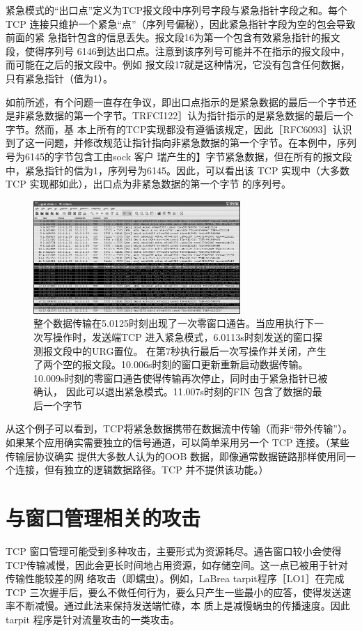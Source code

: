 紧急模式的“出口点”定义为TCP报文段中序列号字段与紧急指针字段之和。每个TCP 连接只维护一个紧急“点”（序列号偏秘），因此紧急指针字段为空的包会导致前面的紧
急指针包含的信息丢失。报文段16为第一个包含有效紧急指针的报文段，使得序列号 6146到达出口点。注意到该序列号可能并不在指示的报文段中，而可能在之后的报文段中。例如
报文段17就是这种情况，它没有包含任何数据，只有紧急指针（值为1）。

如前所述，有个问题一直存在争议，即出口点指示的是紧急数据的最后一个字节还是非紧急数据的第一个字节。TRFCI122］认为指针指示的是紧急数据的最后一个字节。然而，基
本上所有的TCP实现都没有遵循该规定，因此［RFC6093］认识到了这一问题，并修改规范让指针指向非紧急数据的第一个字节。在本例中，序列号为6145的字节包含工由sock 客户
瑞产生的】字节紧急数据，但在所有的报文段中，紧急指针的信为1，序列号为6145。因此，可以看出该 TCP 实现中（大多数 TCP 实现都如此），出口点为非紧急数据的第一个字节
的序列号。
\begin{figure}[!htb]
    \centering
	\includegraphics[width=0.7\textwidth]{imgs/15/15-18.png}
	\caption{整个数据传输在5.0125时刻出现了一次零窗口通告。当应用执行下一次写操作时，发送端TCP 进入紧急模式，6.0113s时刻发送的窗口探测报文段中的URG置位。
    在第7秒执行最后一次写操作并关闭，产生了两个空的报文段。10.006s时刻的窗口更新重新启动数据传输。10.009s时刻的零窗口通告使得传输再次停止，同时由于紧急指针已被确认，
    因此可以退出紧急模式。11.007s时刻的FIN 包含了数据的最后一个字节}
\end{figure}
从这个例子可以看到，TCP将紧急数据携带在数据流中传输（而非“带外传输”）。如果某个应用确实需要独立的信号通道，可以简单采用另一个 TCP 连接。（某些传输层协议确实
提供大多数人认为的OOB 数据，即像通常数据链路那样使用同一个连接，但有独立的逻辑数据路径。TCP 并不提供该功能。）


\section{与窗口管理相关的攻击}
TCP 窗口管理可能受到多种攻击，主要形式为资源耗尽。通告窗口较小会使得TCP传输减慢，因此会更长时间地占用资源，如存储空间。这一点已被用于针对传输性能较差的网
络攻击（即蠕虫）。例如，LaBrea tarpit程序［LO1］在完成 TCP 三次握手后，要么不做任何行为，要么只产生一些最小的应答，使得发送速率不断减慢。通过此法来保持发送端忙碌，本
质上是减慢蜗虫的传播速度。因此 tarpit 程序是针对流量攻击的一类攻击。

